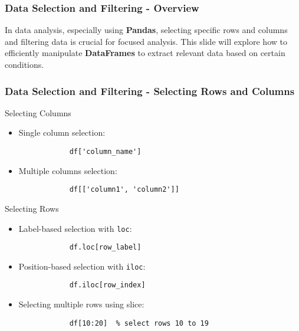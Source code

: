 \documentclass[aspectratio=169]{beamer}
\begin{document}
\begin{frame}[fragile]
    \frametitle{Data Selection and Filtering - Overview}
    In data analysis, especially using \textbf{Pandas}, selecting specific rows and columns and filtering data is crucial for focused analysis. 
    This slide will explore how to efficiently manipulate \textbf{DataFrames} to extract relevant data based on certain conditions.
\end{frame}

\begin{frame}[fragile]
    \frametitle{Data Selection and Filtering - Selecting Rows and Columns}
    \begin{block}{Selecting Columns}
        \begin{itemize}
            \item Single column selection:
            \begin{lstlisting}
            df['column_name']
            \end{lstlisting}
            \item Multiple columns selection:
            \begin{lstlisting}
            df[['column1', 'column2']]
            \end{lstlisting}
        \end{itemize}
    \end{block}

    \begin{block}{Selecting Rows}
        \begin{itemize}
            \item Label-based selection with \texttt{loc}:
            \begin{lstlisting}
            df.loc[row_label]
            \end{lstlisting}
            \item Position-based selection with \texttt{iloc}:
            \begin{lstlisting}
            df.iloc[row_index]
            \end{lstlisting}
            \item Selecting multiple rows using slice:
            \begin{lstlisting}
            df[10:20]  % select rows 10 to 19
            \end{lstlisting}
        \end{itemize}
    \end{block}
\end{frame}
\end{document}
